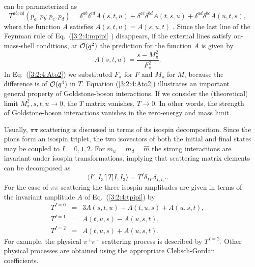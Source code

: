 \documentclass[twoside,12pt]{article}
\begin{document}
can be parameterized as
\begin{equation}
\label{3:2:4:tpipi}
T^{ab;cd}(p_a,p_b;p_c,p_d)=\delta^{ab}\delta^{cd}A(s,t,u)
                  +\delta^{ac}\delta^{bd}A(t,s,u)
                  +\delta^{ad}\delta^{bc}A(u,t,s),
\end{equation}
where the function $A$ satisfies
$A(s,t,u)=A(s,u,t)$ \cite{Weinberg:1966kf}.
   Since the last line of the Feynman rule of Eq.~(\ref{3:2:4:mpipi} ) disappears, if the external lines
satisfy on-mass-shell conditions, at ${\cal O}(q^2)$ the prediction
for the function $A$ is given by
\begin{equation}
\label{3:2:4:Ato2}
A(s,t,u)=\frac{s-M_\pi^2}{F_\pi^2}.
\end{equation}
   In Eq.~(\ref{3:2:4:Ato2}) we substituted $F_\pi$ for $F$ and $M_\pi$ for $M$,
because the difference is of ${\cal O}(q^4)$ in $T$.
   Equation (\ref{3:2:4:Ato2}) illustrates an important general property
of Goldstone-boson interactions.
   If we consider the (theoretical) limit $M_\pi^2,s,t,u\to 0$, the $T$ matrix
vanishes, $T\to 0$.
   In other words, the strength of Goldstone-boson interactions vanishes
in the zero-energy and mass limit.

   Usually, $\pi\pi$ scattering is discussed in terms of its isospin decomposition.
   Since the pions form an isospin triplet, the two isovectors of both
the initial and final states may be coupled to $I=0,1,2$.
   For $m_u=m_d=\hat m$ the strong interactions are invariant under isospin
transformations, implying that scattering matrix elements can be decomposed
as
\begin{equation}
\label{3:2:4:tdec}
\langle I',I_3'|T|I,I_3\rangle=T^I \delta_{II'}\delta_{I_3 I_3'}.
\end{equation}
    For the case of $\pi\pi$ scattering the three isospin amplitudes
are given in terms of the invariant amplitude $A$ of Eq.\ (\ref{3:2:4:tpipi})
by \cite{Gasser:1983yg}
\begin{eqnarray}
\label{3:2:4:isk}
T^{I=0}&=&3A(s,t,u)+A(t,u,s)+A(u,s,t),\nonumber\\
T^{I=1}&=&A(t,u,s)-A(u,s,t),\nonumber\\
T^{I=2}&=&A(t,u,s)+A(u,s,t).
\end{eqnarray}
   For example, the physical $\pi^+\pi^+$ scattering process is described by
$T^{I=2}$.
   Other physical processes are obtained using the appropriate Clebsch-Gordan
coefficients.
\end{document}
